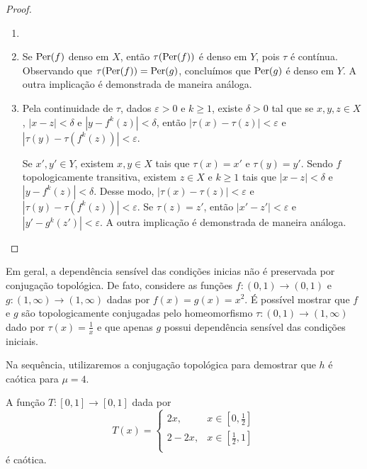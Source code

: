 \begin{proof}
\begin{enumerate}\item[]
\item Se $\operatorname{Per}(f)$ denso em $X$, então $\tau(\operatorname{Per}(f))$ é denso em $Y$, pois $\tau$ é contínua. Observando que $\tau(\operatorname{Per}(f)) = \operatorname{Per}(g)$, concluímos que $\operatorname{Per}(g)$ é denso em $Y$. A outra implicação é demonstrada de maneira análoga.

\item Pela continuidade de $\tau$, dados $\varepsilon > 0$ e $k \geq 1$, existe $\delta > 0$ tal que se $x, y, z \in X$, $|x - z| < \delta$ e $|y - f^k(z)| < \delta$, então $|\tau(x) - \tau(z)| < \varepsilon$ e $|\tau(y) - \tau(f^k(z))| < \varepsilon$.

Se $x', y' \in Y$, existem $x, y \in X$ tais que $\tau(x) = x'$ e $\tau(y) =  y'$. Sendo $f$ topologicamente transitiva, existem $z \in X$ e $k \geq 1$ tais que $|x - z| < \delta$ e $|y - f^k(z)| < \delta$. Desse modo, $|\tau(x) - \tau(z)| < \varepsilon$ e $|\tau(y) - \tau(f^k(z))| < \varepsilon$. Se $\tau(z) = z'$, então $|x' - z'| < \varepsilon$ e $|y' - g^k(z')| < \varepsilon$. A outra implicação é demonstrada de maneira análoga.
\end{enumerate}
\end{proof}

Em geral, a dependência sensível das condições inicias não é preservada por conjugação topológica. De fato, considere as funções $f: (0, 1) \to (0, 1)$ e $g: (1, \infty) \to (1, \infty)$ dadas por $f(x) = g(x) = x^2$. É possível mostrar que $f$ e $g$ são topologicamente conjugadas pelo homeomorfismo $\tau: (0, 1) \to (1, \infty)$ dado por $\tau(x) = \frac{1}{x}$ e que apenas $g$ possui dependência sensível das condições iniciais. 

Na sequência, utilizaremos a conjugação topológica para demostrar que $h$ é caótica para $\mu = 4$.

\begin{lemma}
A função $T: [0,1] \to [0,1]$ dada por
\[ T(x) =
  \begin{cases}
    2x, & x \in \left[ 0, \frac{1}{2} \right] \\
    2 - 2x, & x \in \left[ \frac{1}{2}, 1 \right] \\
  \end{cases}
\]
é caótica.
\end{lemma}

